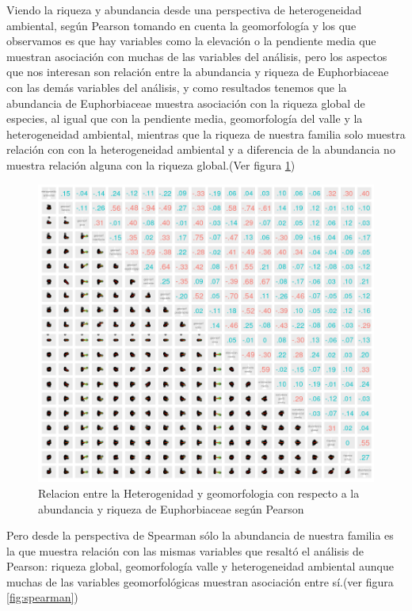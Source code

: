 \documentclass[11pt,]{article}
\begin{document}
Viendo la riqueza y abundancia desde una perspectiva de heterogeneidad
ambiental, según Pearson tomando en cuenta la geomorfología y los que
observamos es que hay variables como la elevación o la pendiente media
que muestran asociación con muchas de las variables del análisis, pero
los aspectos que nos interesan son relación entre la abundancia y
riqueza de Euphorbiaceae con las demás variables del análisis, y como
resultados tenemos que la abundancia de Euphorbiaceae muestra asociación
con la riqueza global de especies, al igual que con la pendiente media,
geomorfología del valle y la heterogeneidad ambiental, mientras que la
riqueza de nuestra familia solo muestra relación con con la
heterogeneidad ambiental y a diferencia de la abundancia no muestra
relación alguna con la riqueza global.(Ver figura \ref{fig:geo_pearson})

\begin{figure}
\centering
\includegraphics{geo_pearson.png}
\caption{\label{fig:geo_pearson} Relacion entre la Heterogenidad y
geomorfologia con respecto a la abundancia y riqueza de Euphorbiaceae
según Pearson}
\end{figure}

Pero desde la perspectiva de Spearman sólo la abundancia de nuestra
familia es la que muestra relación con las mismas variables que resaltó
el análisis de Pearson: riqueza global, geomorfología valle y
heterogeneidad ambiental aunque muchas de las variables geomorfológicas
muestran asociación entre sí.(ver figura \ref{fig:spearman})
\end{document}
